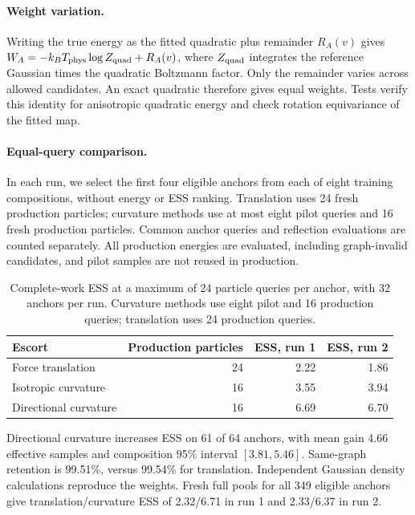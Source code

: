 \paragraph{Weight variation.}
Writing the true energy as the fitted quadratic plus remainder $R_A(v)$ gives $W_A=-k_B T_{\rm phys}\log Z_{\rm quad}+R_A(v)$, where $Z_{\rm quad}$ integrates the reference Gaussian times the quadratic Boltzmann factor. Only the remainder varies across allowed candidates. An exact quadratic therefore gives equal weights. Tests verify this identity for anisotropic quadratic energy and check rotation equivariance of the fitted map.

\paragraph{Equal-query comparison.}
In each run, we select the first four eligible anchors from each of eight training compositions, without energy or ESS ranking. Translation uses 24 fresh production particles; curvature methods use at most eight pilot queries and 16 fresh production particles. Common anchor queries and reflection evaluations are counted separately. All production energies are evaluated, including graph-invalid candidates, and pilot samples are not reused in production.

\begin{table}[htbp]
\centering
\caption{Complete-work ESS at a maximum of 24 particle queries per anchor, with 32 anchors per run. Curvature methods use eight pilot and 16 production queries; translation uses 24 production queries.}
\begin{tabular}{lrrr}
\toprule
Escort & Production particles & ESS, run 1 & ESS, run 2\\
\midrule
Force translation &24&2.22&1.86\\
Isotropic curvature &16&3.55&3.94\\
Directional curvature &16&6.69&6.70\\
\bottomrule
\end{tabular}
\end{table}

Directional curvature increases ESS on 61 of 64 anchors, with mean gain 4.66 effective samples and composition 95\% interval $[3.81,5.46]$. Same-graph retention is 99.51\%, versus 99.54\% for translation. Independent Gaussian density calculations reproduce the weights. Fresh full pools for all 349 eligible anchors give translation/curvature ESS of 2.32/6.71 in run 1 and 2.33/6.37 in run 2.

